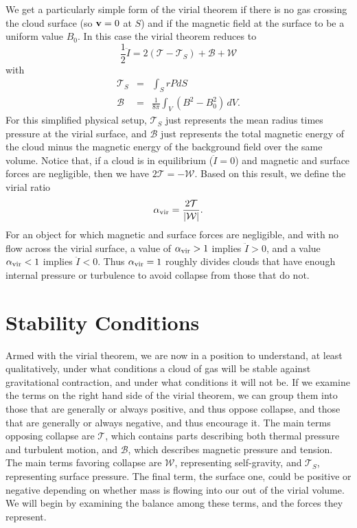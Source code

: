 We get a particularly simple form of the virial theorem if there is no gas crossing the cloud surface (so $\mathbf{v}=0$ at $S$) and if the magnetic field at the surface to be a uniform value $B_0$. In this case the virial theorem reduces to
\begin{equation}
\frac{1}{2}\ddot{I} = 2(\mathcal{T} - \mathcal{T}_S) + \mathcal{B} + \mathcal{W}
\end{equation}
with
\begin{eqnarray}
\mathcal{T}_S & = & \int_S rP dS\\
\mathcal{B} & = & \frac{1}{8\pi} \int_V (B^2-B_0^2) \,dV.
\end{eqnarray}
For this simplified physical setup, $\mathcal{T}_S$ just represents the mean radius times pressure at the virial surface, and $\mathcal{B}$ just represents the total magnetic energy of the cloud minus the magnetic energy of the background field over the same volume. Notice that, if a cloud is in equilibrium ($\ddot{I}=0$) and magnetic and surface forces are negligible, then we have $2\mathcal{T} = -\mathcal{W}$. Based on this result, we define the virial ratio
\begin{equation}
\alpha_{\rm vir} = \frac{2\mathcal{T}}{|\mathcal{W}|}.
\end{equation}
For an object for which magnetic and surface forces are negligible, and with no flow across the virial surface, a value of $\alpha_{\rm vir} > 1$ implies $\ddot{I} > 0$, and a value $\alpha_{\rm vir} < 1$ implies $\ddot{I}<0$. Thus $\alpha_{\rm vir} = 1$ roughly divides clouds that have enough internal pressure or turbulence to avoid collapse from those that do not.

\section{Stability Conditions}

Armed with the virial theorem, we are now in a position to understand, at least qualitatively, under what conditions a cloud of gas will be stable against gravitational contraction, and under what conditions it will not be. If we examine the terms on the right hand side of the virial theorem, we can group them into those that are generally or always positive, and thus oppose collapse, and those that are generally or always negative, and thus encourage it. The main terms opposing collapse are $\mathcal{T}$, which contains parts describing both thermal pressure and turbulent motion, and $\mathcal{B}$, which describes magnetic pressure and tension. The main terms favoring collapse are $\mathcal{W}$, representing self-gravity, and $\mathcal{T}_S$, representing surface pressure. The final term, the surface one, could be positive or negative depending on whether mass is flowing into our out of the virial volume. We will begin by examining the balance among these terms, and the forces they represent.


